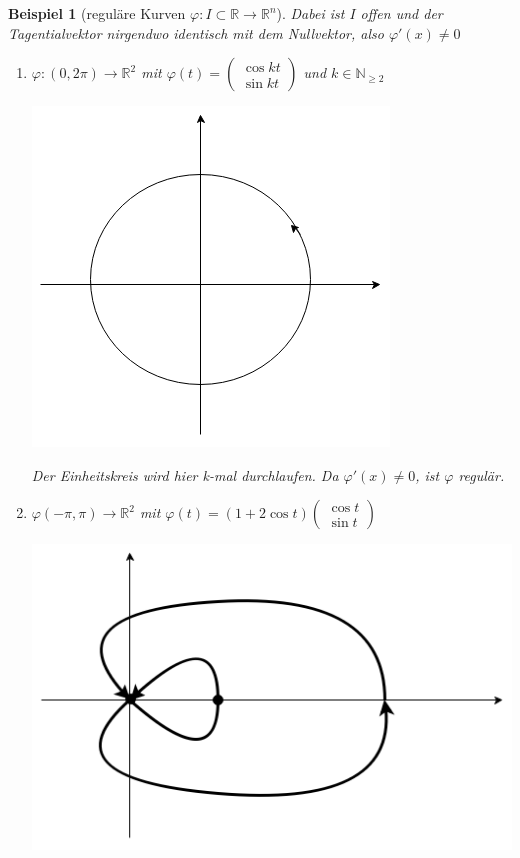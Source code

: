 \documentclass[a4paper,12pt,portrait]{book}
\theoremstyle{theoremstyle}
\newtheorem{beispiel}[theo]{Beispiel}
\begin{document}
\begin{beispiel}[reguläre Kurven $\varphi:I\subset\mathbb{R}\rightarrow\mathbb{R}^n$]
Dabei ist $I$ offen und der Tagentialvektor nirgendwo identisch mit dem Nullvektor, also $\varphi'(x)\neq 0$
\begin{enumerate}
\item $\varphi:(0,2\pi)\rightarrow\mathbb{R}^2$ mit $\varphi(t)=\begin{pmatrix}
\cos kt \\ \sin kt
\end{pmatrix}$ und $k\in\mathbb{N}_{\geq 2}$\\
\begin{center}\includegraphics[scale=0.3]{pictures/MA2_0002}\\ \end{center}
Der Einheitskreis wird hier k-mal durchlaufen. Da $\varphi'(x)\neq 0$, ist $\varphi$ regulär.
\item $\varphi(-\pi,\pi)\rightarrow\mathbb{R}^2$ mit $\varphi(t)=(1+2\cos t)\begin{pmatrix}
\cos t \\ \sin t
\end{pmatrix}$\\
\begin{center}
\includegraphics[scale=0.3]{pictures/MA2_0003}\\

\end{center}
\end{enumerate}
\end{beispiel}
\end{document}
